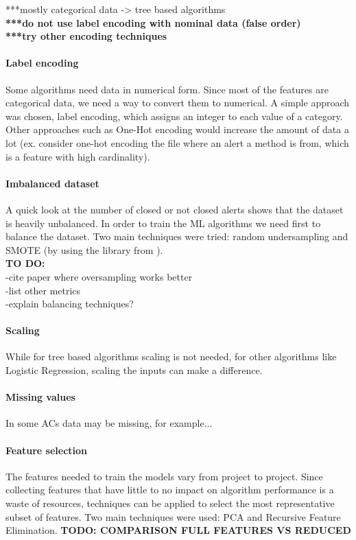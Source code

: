 ***mostly categorical data -> tree based algorithms\\
\textbf{***do not use label encoding with nominal data (false order)}\\
\textbf{***try other encoding techniques}

\paragraph{Label encoding} Some algorithms need data in numerical form. Since most of the features are categorical data, we need a way to convert them to numerical. A simple approach was chosen, label encoding, which assigns an integer to each value of a category. Other approaches such as One-Hot encoding would increase the amount of data a lot (ex. consider one-hot encoding the file where an alert a method is from, which is a feature with high cardinality).

\paragraph{Imbalanced dataset} A quick look at the number of closed or not closed alerts shows that the dataset is heavily unbalanced. In order to train the ML algorithms we need first to balance the dataset. Two main techniques were tried: random undersampling and SMOTE (by using the library from \cite{imblearn}).\\

\textbf{TO DO:}\\
-cite paper where oversampling works better\\
-list other metrics\\
-explain balancing techniques?

\paragraph{Scaling} While for tree based algorithms scaling is not needed, for other algorithms like Logistic Regression, scaling the inputs can make a difference.

\paragraph{Missing values} In some ACs data may be missing, for example...

\paragraph{Feature selection} The features needed to train the models vary from project to project. Since collecting features that have little to no impact on algorithm performance is a waste of resources, techniques can be applied to select the most representative subset of features. Two main techniques were used: PCA and Recursive Feature Elimination.
\textbf{TODO: COMPARISON FULL FEATURES VS REDUCED}

